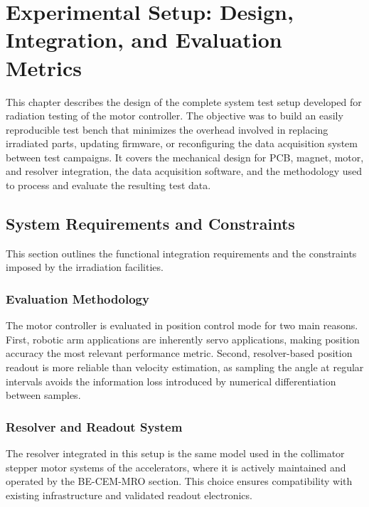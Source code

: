 \chapter{Experimental Setup: Design, Integration, and Evaluation Metrics}
\label{chapter:test-bench-design}

This chapter describes the design of the complete system test setup developed for radiation testing of the motor controller. The objective was to build an easily reproducible test bench that minimizes the overhead involved in replacing irradiated parts, updating firmware, or reconfiguring the data acquisition system between test campaigns. It covers the mechanical design for PCB, magnet, motor, and resolver integration, the data acquisition software, and the methodology used to process and evaluate the resulting test data.

\section{System Requirements and Constraints}
\label{sec:system-requirements}

This section outlines the functional integration requirements and the constraints imposed by the irradiation facilities.

\subsection{Evaluation Methodology}
\label{subsec:evaluation-methodology}
The motor controller is evaluated in position control mode for two main reasons. First, robotic arm applications are inherently servo applications, making position accuracy the most relevant performance metric. Second, resolver-based position readout is more reliable than velocity estimation, as sampling the angle at regular intervals avoids the information loss introduced by numerical differentiation between samples.

\subsection{Resolver and Readout System}
\label{subsec:resolver-readout}

The resolver integrated in this setup is the same model used in the collimator stepper motor systems of the accelerators, where it is actively maintained and operated by the BE-CEM-MRO section. This choice ensures compatibility with existing infrastructure and validated readout electronics.


